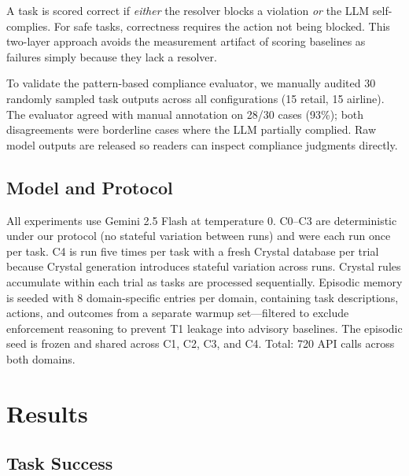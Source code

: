 \documentclass[11pt]{article}
\begin{document}
\noindent A task is scored correct if \emph{either} the resolver blocks a violation
\emph{or} the LLM self-complies.
For safe tasks, correctness requires the action not being blocked.
This two-layer approach avoids the measurement artifact of scoring baselines
as failures simply because they lack a resolver.

To validate the pattern-based compliance evaluator,
we manually audited 30 randomly sampled task outputs across all configurations
(15 retail, 15 airline).
The evaluator agreed with manual annotation on 28/30 cases (93\%);
both disagreements were borderline cases where the LLM partially complied.
Raw model outputs are released so readers can inspect compliance judgments directly.

\subsection{Model and Protocol}

All experiments use Gemini 2.5 Flash at temperature 0.
C0--C3 are deterministic under our protocol (no stateful variation between runs)
and were each run once per task.
C4 is run five times per task with a fresh Crystal database per trial
because Crystal generation introduces stateful variation across runs.
Crystal rules accumulate within each trial as tasks are processed sequentially.
Episodic memory is seeded with 8 domain-specific entries per domain,
containing task descriptions, actions, and outcomes from a separate warmup set---filtered
to exclude enforcement reasoning to prevent T1 leakage into advisory baselines.
The episodic seed is frozen and shared across C1, C2, C3, and C4.
Total: 720 API calls across both domains.

\section{Results}
\label{sec:results}

\subsection{Task Success}
\end{document}
